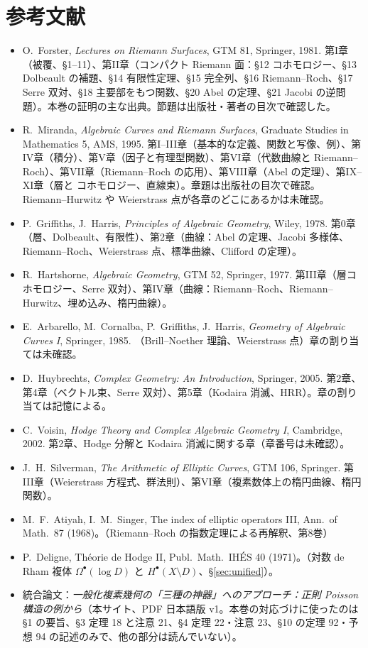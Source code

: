 \section*{参考文献}
\begin{itemize}
\item O.~Forster, \emph{Lectures on Riemann Surfaces}, GTM 81, Springer, 1981. 第I章（被覆、§1--11）、第II章（コンパクト Riemann 面：§12 コホモロジー、§13 Dolbeault の補題、§14 有限性定理、§15 完全列、§16 Riemann--Roch、§17 Serre 双対、§18 主要部をもつ関数、§20 Abel の定理、§21 Jacobi の逆問題）。本巻の証明の主な出典。節題は出版社・著者の目次で確認した。
\item R.~Miranda, \emph{Algebraic Curves and Riemann Surfaces}, Graduate Studies in Mathematics 5, AMS, 1995. 第I--III章（基本的な定義、関数と写像、例）、第IV章（積分）、第V章（因子と有理型関数）、第VI章（代数曲線と Riemann--Roch）、第VII章（Riemann--Roch の応用）、第VIII章（Abel の定理）、第IX--XI章（層と \Cech{} コホモロジー、直線束）。章題は出版社の目次で確認。Riemann--Hurwitz や Weierstrass 点が各章のどこにあるかは未確認\tQ。
\item P.~Griffiths, J.~Harris, \emph{Principles of Algebraic Geometry}, Wiley, 1978. 第0章（層、Dolbeault、有限性）、第2章（曲線：Abel の定理、Jacobi 多様体、Riemann--Roch、Weierstrass 点、標準曲線、Clifford の定理）。
\item R.~Hartshorne, \emph{Algebraic Geometry}, GTM 52, Springer, 1977. 第III章（層コホモロジー、Serre 双対）、第IV章（曲線：Riemann--Roch、Riemann--Hurwitz、埋め込み、楕円曲線）。
\item E.~Arbarello, M.~Cornalba, P.~Griffiths, J.~Harris, \emph{Geometry of Algebraic Curves I}, Springer, 1985. （Brill--Noether 理論、Weierstrass 点）章の割り当ては未確認\tQ。
\item D.~Huybrechts, \emph{Complex Geometry: An Introduction}, Springer, 2005. 第2章、第4章（ベクトル束、Serre 双対）、第5章（Kodaira 消滅、HRR）。章の割り当ては記憶による\tQ。
\item C.~Voisin, \emph{Hodge Theory and Complex Algebraic Geometry I}, Cambridge, 2002. 第2章、Hodge 分解と Kodaira 消滅に関する章（章番号は未確認\tQ）。
\item J.~H.~Silverman, \emph{The Arithmetic of Elliptic Curves}, GTM 106, Springer. 第III章（Weierstrass 方程式、群法則）、第VI章（複素数体上の楕円曲線、楕円関数）。
\item M.~F.~Atiyah, I.~M.~Singer, The index of elliptic operators III, Ann.\ of Math.\ 87 (1968)。（Riemann--Roch の指数定理による再解釈、第8巻）
\item P.~Deligne, Théorie de Hodge II, Publ.\ Math.\ IHÉS 40 (1971)。（対数 de Rham 複体 $\Omega^\bullet(\log D)$ と $H^\bullet(X\setminus D)$、\S\ref{sec:unified}）\tQ。
\item 統合論文：\emph{一般化複素幾何の「三種の神器」へのアプローチ：正則 Poisson 構造の例から}（本サイト、PDF 日本語版 v1。本巻の対応づけに使ったのは §1 の要旨、§3 定理 18 と注意 21、§4 定理 22・注意 23、§10 の定理 92・予想 94 の記述のみで、他の部分は読んでいない）。
\end{itemize}

